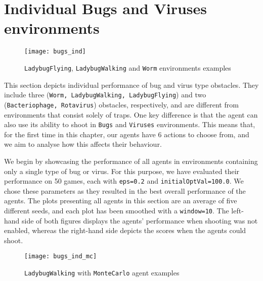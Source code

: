 \section{Individual Bugs and Viruses environments}
\begin{figure}[h]
    \centering
    \texttt{[image: bugs\_ind]}
    \caption{\texttt{LadybugFlying}, \texttt{LadybugWalking} and \texttt{Worm} environments examples}
    \label{fig:bugs_ind_eg}
\end{figure}

This section depicts individual performance of bug and virus type obstacles. They include three (\texttt{Worm, LadybugWalking, LadybugFlying}) and two (\texttt{Bacteriophage, Rotavirus}) obstacles, respectively, and are different from environments that consist solely of traps. One key difference is that the agent can also use its ability to shoot in \texttt{Bugs} and \texttt{Viruses} environments. This means that, for the first time in this chapter, our agents have 6 actions to choose from, and we aim to analyse how this affects their behaviour.

We begin by showcasing the performance of all agents in environments containing only a single type of bug or virus. For this purpose, we have evaluated their performance on 50 games, each with \texttt{eps=0.2} and \texttt{initialOptVal=100.0}. We chose these parameters as they resulted in the best overall performance of the agents. The plots presenting all agents in this section are an average of five different seeds, and each plot has been smoothed with a \texttt{window=10}. The left-hand side of both figures displays the agents' performance when shooting was not enabled, whereas the right-hand side depicts the scores when the agents could shoot.

\begin{figure}[h]
    \centering
    \texttt{[image: bugs\_ind\_mc]}
    \caption{\texttt{LadybugWalking} with \texttt{MonteCarlo} agent examples}
    \label{fig:bugs_ind_mc_eg}
\end{figure}

